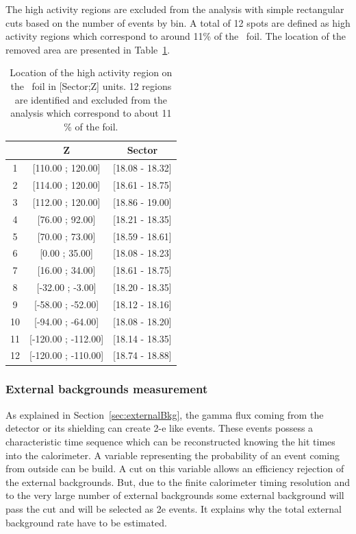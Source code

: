 \documentclass[main.tex]{subfiles}
\begin{document}
\bigskip


\NI The high activity regions are excluded from the analysis with simple rectangular cuts based on the number of events by bin. A total of 12 spots are defined as high activity regions which correspond to around 11\% of the \Cd~foil. The location of the removed area are presented in Table~\ref{Tab:HighActivityRegion}. 


\begin{table}
\centering
\begin{tabular}{c|c|c}
  & Z                 & Sector \\
\midrule
1  & [110.00 ; 120.00]   & [18.08 - 18.32] \\ [0.1cm]
2  & [114.00 ; 120.00]   & [18.61 - 18.75] \\ [0.1cm]
3  & [112.00 ; 120.00]   & [18.86 - 19.00] \\ [0.1cm]
4  & [76.00 ; 92.00]     & [18.21 - 18.35] \\ [0.1cm]
5  & [70.00 ; 73.00]     & [18.59 - 18.61] \\ [0.1cm]
6  & [0.00 ; 35.00]      & [18.08 - 18.23] \\ [0.1cm]
7  & [16.00 ; 34.00]     & [18.61 - 18.75] \\ [0.1cm]
8  & [-32.00 ; -3.00]    & [18.20 - 18.35] \\ [0.1cm]
9  & [-58.00 ; -52.00]   & [18.12 - 18.16] \\ [0.1cm]
10 & [-94.00 ; -64.00]   & [18.08 - 18.20] \\ [0.1cm]
11 & [-120.00 ; -112.00] & [18.14 - 18.35] \\ [0.1cm]
12 & [-120.00 ; -110.00] & [18.74 - 18.88] \\
\bottomrule
\end{tabular}
\caption{Location of the high activity region on the \Cd~foil in [Sector;Z] units. 12 regions are identified and excluded from the analysis which correspond to about 11 \% of the foil.}
\label{Tab:HighActivityRegion}
\end{table}


\FloatBarrier


\subsubsection{External backgrounds measurement} \label{sec:External}


\NI As explained in Section~\ref{sec:externalBkg}, the gamma flux coming from the detector or its shielding can create 2-e like events. These events possess a characteristic time sequence which can be reconstructed knowing the hit times into the calorimeter. A variable representing the probability of an event coming from outside can be build. A cut on this variable allows an efficiency rejection of the external backgrounds. But, due to the finite calorimeter timing resolution and to the very large number of external backgrounds some external background will pass the cut and will be selected as 2e events. It explains why the total external background rate have to be estimated. 
\end{document}
